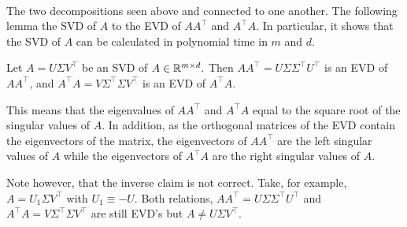 ~\\The two decompositions seen above and connected to one another. The following lemma the SVD of $A$ to the EVD of $AA^{\top}$ and $A^{\top}A$. In particular, it shows that the SVD of $A$ can be calculated in polynomial time in $m$ and $d$.

\begin{lemma}
Let $A=U\Sigma V^{\top}$ be an SVD of $A\in\mathbb{R}^{m\times d}.$ Then  $AA^{\top}=U\Sigma\Sigma^{\top}U^{\top}$ is an EVD of $AA^{\top}$, and $A^{\top}A=V\Sigma^{\top}\Sigma V^{\top}$ is an EVD of $A^{\top}A$.
\end{lemma}

This means that the eigenvalues of $AA^\top$ and $A^\top A$ equal to the square root of the singular values of $A$. In addition, as the orthogonal matrices of the EVD contain the eigenvectors of the matrix, the eigenvectors of $AA^\top$ are the left singular values of $A$ while the eigenvectors of $A^\top A$ are the right singular values of $A$.

\begin{remark}
Note however, that the inverse claim is not correct. Take, for example, $A=U_1\Sigma V^{\top}$ with $U_1 \equiv -U$. Both relations, $AA^{\top}=U\Sigma\Sigma^{\top}U^{\top}$ and $A^{\top}A=V\Sigma^{\top}\Sigma V^{\top}$ are still EVD's but $A\neq U\Sigma V^{\top}.$
\end{remark}